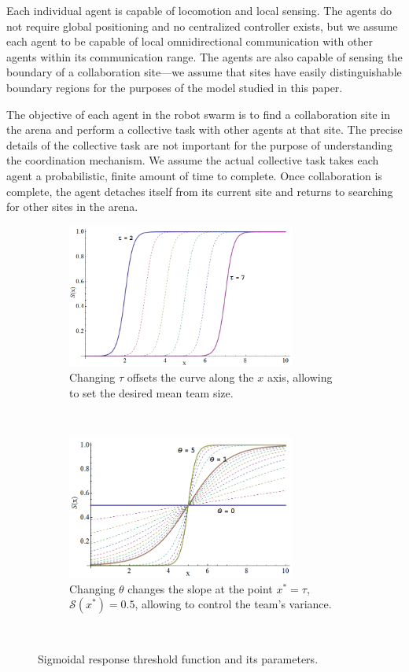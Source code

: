 \documentclass{TeXstyles/DARS/svmult}  %
\newcommand{\sig}{\mathcal{S}}
\begin{document}
Each individual agent is capable of locomotion and local sensing. The agents do not require global positioning and no centralized controller exists, but we assume each agent to be capable of local omnidirectional communication with other agents within its communication range. The agents are also capable of sensing the boundary of a collaboration site---we assume that sites have easily distinguishable boundary regions for the purposes of the model studied in this paper.

The objective of each agent in the robot swarm is to find a collaboration site in the arena and perform a collective task with other agents at that site. The precise details of the collective task are not important for the purpose of understanding the coordination mechanism. We assume the actual collective task takes each agent a probabilistic, finite amount of time to complete. Once collaboration is complete, the agent detaches itself from its current site and returns to searching for other sites in the arena. 

\begin{figure}[!htb]
\centering\begin{subfigure}{.5\textwidth}
\centering\includegraphics[width=7.5cm]{figures/sigmoid2.png}
\caption{Changing $\tau$ offsets the curve along the $x$ axis, allowing to set the desired mean team size.}\label{}
\end{subfigure}~
\centering\begin{subfigure}{.5\textwidth}
\centering\includegraphics[width=7.5cm]{figures/sigmoid1.png}
\caption{Changing $\theta$ changes the slope at the point $x^* = \tau$, $\sig(x^*) = 0.5$, allowing to control the team's variance.}\label{}
\end{subfigure}~
\caption{Sigmoidal response threshold function and its parameters.}\label{fig:sig}
\end{figure}
\end{document}
